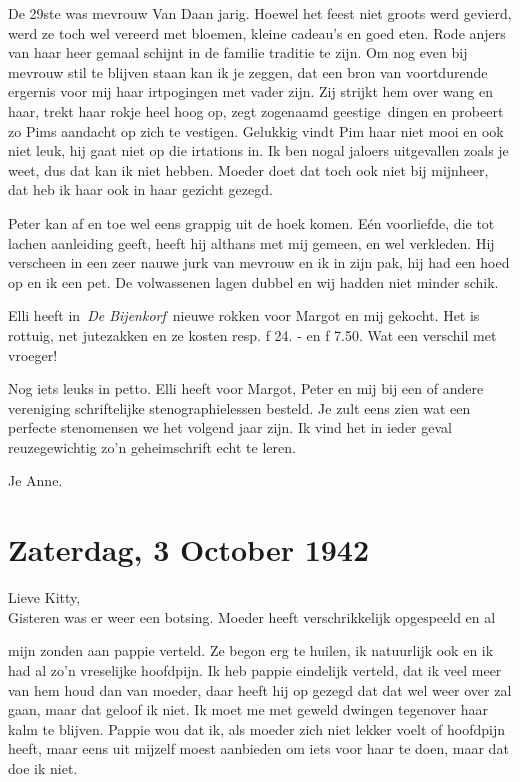 \documentclass{book}
\begin{document}
De 29ste was mevrouw Van Daan jarig. Hoewel het feest niet groots werd
gevierd, werd ze toch wel vereerd met bloemen, kleine cadeau's en goed
eten. Rode anjers van haar heer gemaal schijnt in de familie traditie te
zijn. Om nog even bij mevrouw stil te blijven staan kan ik je zeggen,
dat een bron van voortdurende ergernis voor mij haar irtpogingen met
vader zijn. Zij strijkt hem over wang en haar, trekt haar rokje heel
hoog op, zegt zogenaamd geestige~dingen en probeert zo Pims aandacht op
zich te vestigen. Gelukkig vindt Pim haar niet mooi en ook niet leuk,
hij gaat niet op die irtations in. Ik ben nogal jaloers uitgevallen
zoals je weet, dus dat kan ik niet hebben. Moeder doet dat toch ook niet
bij mijnheer, dat heb ik haar ook in haar gezicht gezegd.

Peter kan af en toe wel eens grappig uit de hoek komen. Eén voorliefde,
die tot lachen aanleiding geeft, heeft hij althans met mij gemeen, en
wel verkleden. Hij verscheen in een zeer nauwe jurk van mevrouw en ik in
zijn pak, hij had een hoed op en ik een pet. De volwassenen lagen dubbel
en wij hadden niet minder schik.

Elli heeft in~\emph{De Bijenkorf}~nieuwe rokken voor Margot en mij
gekocht. Het is rottuig, net jutezakken en ze kosten resp. ƒ 24. - en ƒ
7.50. Wat een verschil met vroeger!

Nog iets leuks in petto. Elli heeft voor Margot, Peter en mij bij een of
andere vereniging schriftelijke stenographielessen besteld. Je zult eens
zien wat een perfecte stenomensen we het volgend jaar zijn. Ik vind het
in ieder geval reuzegewichtig zo'n geheimschrift echt te leren.

Je Anne.

\chapter{Zaterdag, 3 October 1942}

Lieve Kitty,\\Gisteren was er weer een botsing. Moeder heeft
verschrikkelijk opgespeeld en al

mijn zonden aan pappie verteld. Ze begon erg te huilen, ik natuurlijk
ook en ik had al zo'n vreselijke hoofdpijn. Ik heb pappie eindelijk
verteld, dat ik veel meer van hem houd dan van moeder, daar heeft hij op
gezegd dat dat wel weer over zal gaan, maar dat geloof ik niet. Ik moet
me met geweld dwingen tegenover haar kalm te blijven. Pappie wou dat ik,
als moeder zich niet lekker voelt of hoofdpijn heeft, maar eens uit
mijzelf moest aanbieden om iets voor haar te doen, maar dat doe ik niet.
\end{document}
